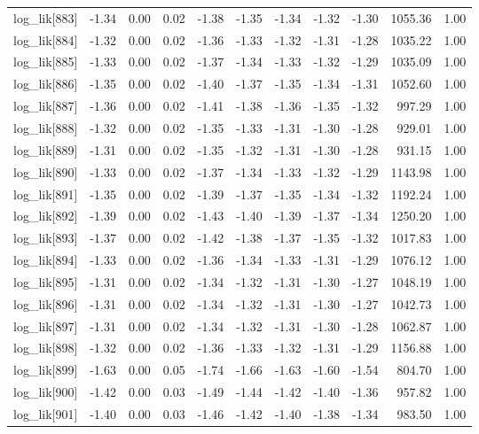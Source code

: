 \begin{table}[ht]
\begin{tabular}{rrrrrrrrrrr}
  log\_lik[883] & -1.34 & 0.00 & 0.02 & -1.38 & -1.35 & -1.34 & -1.32 & -1.30 & 1055.36 & 1.00 \\ 
  log\_lik[884] & -1.32 & 0.00 & 0.02 & -1.36 & -1.33 & -1.32 & -1.31 & -1.28 & 1035.22 & 1.00 \\ 
  log\_lik[885] & -1.33 & 0.00 & 0.02 & -1.37 & -1.34 & -1.33 & -1.32 & -1.29 & 1035.09 & 1.00 \\ 
  log\_lik[886] & -1.35 & 0.00 & 0.02 & -1.40 & -1.37 & -1.35 & -1.34 & -1.31 & 1052.60 & 1.00 \\ 
  log\_lik[887] & -1.36 & 0.00 & 0.02 & -1.41 & -1.38 & -1.36 & -1.35 & -1.32 & 997.29 & 1.00 \\ 
  log\_lik[888] & -1.32 & 0.00 & 0.02 & -1.35 & -1.33 & -1.31 & -1.30 & -1.28 & 929.01 & 1.00 \\ 
  log\_lik[889] & -1.31 & 0.00 & 0.02 & -1.35 & -1.32 & -1.31 & -1.30 & -1.28 & 931.15 & 1.00 \\ 
  log\_lik[890] & -1.33 & 0.00 & 0.02 & -1.37 & -1.34 & -1.33 & -1.32 & -1.29 & 1143.98 & 1.00 \\ 
  log\_lik[891] & -1.35 & 0.00 & 0.02 & -1.39 & -1.37 & -1.35 & -1.34 & -1.32 & 1192.24 & 1.00 \\ 
  log\_lik[892] & -1.39 & 0.00 & 0.02 & -1.43 & -1.40 & -1.39 & -1.37 & -1.34 & 1250.20 & 1.00 \\ 
  log\_lik[893] & -1.37 & 0.00 & 0.02 & -1.42 & -1.38 & -1.37 & -1.35 & -1.32 & 1017.83 & 1.00 \\ 
  log\_lik[894] & -1.33 & 0.00 & 0.02 & -1.36 & -1.34 & -1.33 & -1.31 & -1.29 & 1076.12 & 1.00 \\ 
  log\_lik[895] & -1.31 & 0.00 & 0.02 & -1.34 & -1.32 & -1.31 & -1.30 & -1.27 & 1048.19 & 1.00 \\ 
  log\_lik[896] & -1.31 & 0.00 & 0.02 & -1.34 & -1.32 & -1.31 & -1.30 & -1.27 & 1042.73 & 1.00 \\ 
  log\_lik[897] & -1.31 & 0.00 & 0.02 & -1.34 & -1.32 & -1.31 & -1.30 & -1.28 & 1062.87 & 1.00 \\ 
  log\_lik[898] & -1.32 & 0.00 & 0.02 & -1.36 & -1.33 & -1.32 & -1.31 & -1.29 & 1156.88 & 1.00 \\ 
  log\_lik[899] & -1.63 & 0.00 & 0.05 & -1.74 & -1.66 & -1.63 & -1.60 & -1.54 & 804.70 & 1.00 \\ 
  log\_lik[900] & -1.42 & 0.00 & 0.03 & -1.49 & -1.44 & -1.42 & -1.40 & -1.36 & 957.82 & 1.00 \\ 
  log\_lik[901] & -1.40 & 0.00 & 0.03 & -1.46 & -1.42 & -1.40 & -1.38 & -1.34 & 983.50 & 1.00 \\ 

\end{tabular}
\end{table}
